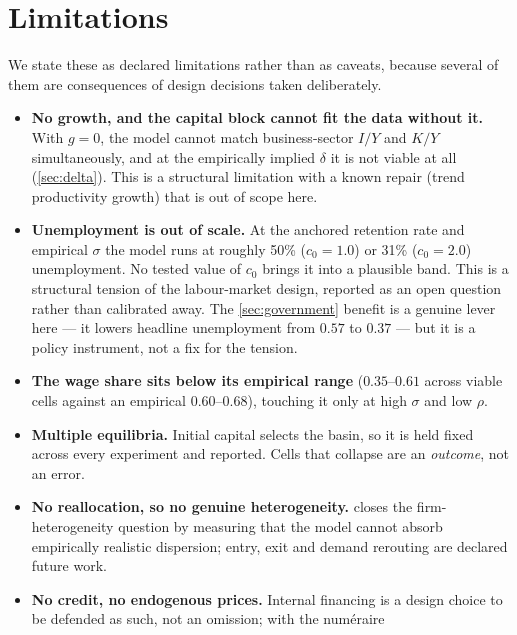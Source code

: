 
\section{Limitations}
\label{sec:limits}

We state these as declared limitations rather than as caveats, because several
of them are consequences of design decisions taken deliberately.

\begin{itemize}
  \item \textbf{No growth, and the capital block cannot fit the data without
  it.} With $g = 0$, the model cannot match business-sector $I/Y$ and $K/Y$
  simultaneously, and at the empirically implied $\delta$ it is not viable at
  all (\cref{sec:delta}). This is a structural limitation with a known repair
  (trend productivity growth) that is out of scope here.
  \item \textbf{Unemployment is out of scale.} At the anchored retention rate
  and empirical $\sigma$ the model runs at roughly 50\% ($c_0 = 1.0$) or 31\%
  ($c_0 = 2.0$) unemployment. No tested value of $c_0$ brings it into a
  plausible band. This is a structural tension of the labour-market design,
  reported as an open question rather than calibrated away. The
  \cref{sec:government} benefit is a genuine lever here --- it lowers headline
  unemployment from $0.57$ to $0.37$ --- but it is a policy instrument, not a
  fix for the tension.
  \item \textbf{The wage share sits below its empirical range} ($0.35$--$0.61$
  across viable cells against an empirical $0.60$--$0.68$), touching it only at
  high $\sigma$ and low $\rho$.
  \item \textbf{Multiple equilibria.} Initial capital selects the basin, so it
  is held fixed across every experiment and reported. Cells that collapse are
  an \emph{outcome}, not an error.
  \item \textbf{No reallocation, so no genuine heterogeneity.}
   closes the firm-heterogeneity question by measuring
  that the model cannot absorb empirically realistic dispersion; entry, exit
  and demand rerouting are declared future work.
  \item \textbf{No credit, no endogenous prices.} Internal financing is a
  design choice to be defended as such, not an omission; with the numéraire

\end{itemize}

